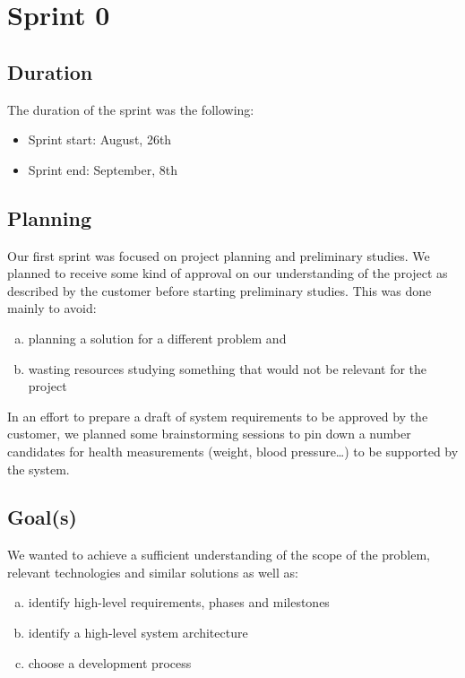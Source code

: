 
\chapter{Sprint 0}
\label{Sprint0}

\section{Duration}
The duration of the sprint was the following:
\begin{itemize}
\item Sprint start: August, 26th
\item Sprint end: September, 8th
\end{itemize}

\section{Planning}

Our first sprint was focused on project planning and preliminary studies.
We planned to receive some kind of approval on our understanding of the project as described by the customer before starting preliminary studies. 
This was done mainly to avoid:
\begin{enumerate}[a)]
\item planning a solution for a different problem and
\item wasting resources studying something that would not be relevant for the project
\end{enumerate}
In an effort to prepare a draft of system requirements to be approved by the customer, we planned some brainstorming sessions to pin down a number candidates for health measurements (weight, blood pressure\ldots) to be supported by the system.

\section{Goal(s)}

We wanted to achieve a sufficient understanding of the scope of the problem,
relevant technologies and similar solutions as well as:%
\begin{enumerate}[a)]
\item identify high-level requirements, phases and milestones
\item identify a high-level system architecture
\item choose a development process
\end{enumerate}

